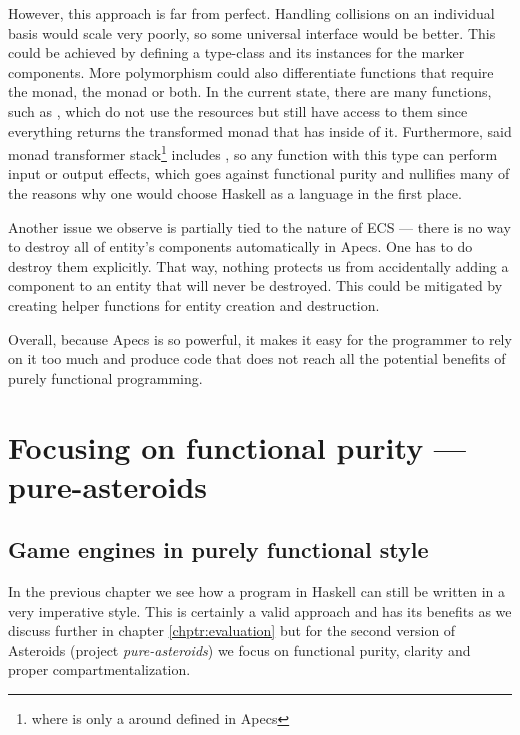 \documentclass[
  digital, %
  color,   %
  table,   %
  oneside, %
  lof,     %
  lot,     %
]{fithesis3}
\begin{document}
However, this approach is far from perfect. Handling collisions on an
individual basis would scale very poorly, so some universal interface would be better.
This could be achieved by defining a type-class and its instances for the marker components.
More polymorphism could also differentiate functions that require the
 monad, the  monad or both.
In the current state, there are many functions, such as ,
which do not use the resources but still have access to them since
everything returns the transformed  monad
that has  inside of it. Furthermore,
said monad transformer stack\footnote{
where  is only a 
around  defined in Apecs
}
includes , so any function with this type can perform
input or output effects, which goes against functional purity and nullifies
many of the reasons why one would choose Haskell as a language in the first place.

Another issue we observe is partially tied to the nature of ECS — there
is no way to destroy all of entity's components automatically in Apecs.
One has to do destroy them explicitly. That way, nothing protects us
from accidentally adding a component to an entity that will never be destroyed.
This could be mitigated by creating helper functions for entity creation and destruction.

Overall, because Apecs is so powerful, it makes it easy for the programmer to rely
on it too much and produce code that does not reach all the potential
benefits of purely functional programming.




\chapter{Focusing on functional purity --- pure-asteroids}
\label{chptr:purity}

\section{Game engines in purely functional style}
\label{sect:pureengines}

In the previous chapter we see how a program in Haskell can still be
written in a very imperative style. 
This is certainly a valid approach and has its benefits as we discuss
further in chapter \ref{chptr:evaluation} but for the second version of
Asteroids (project \emph{pure-asteroids}) we focus on functional purity,
clarity and proper compartmentalization.
\end{document}
